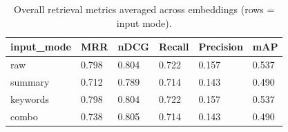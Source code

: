 \begin{table}
\caption{Overall retrieval metrics averaged across embeddings (rows = input mode).}
\label{tab:overview-by-input-mode}
\begin{tabular}{llllll}
\toprule
input_mode & MRR & nDCG & Recall & Precision & mAP \\
\midrule
raw & 0.798 & 0.804 & 0.722 & 0.157 & 0.537 \\
summary & 0.712 & 0.789 & 0.714 & 0.143 & 0.490 \\
keywords & 0.798 & 0.804 & 0.722 & 0.157 & 0.537 \\
combo & 0.738 & 0.805 & 0.714 & 0.143 & 0.490 \\
\bottomrule
\end{tabular}
\end{table}
